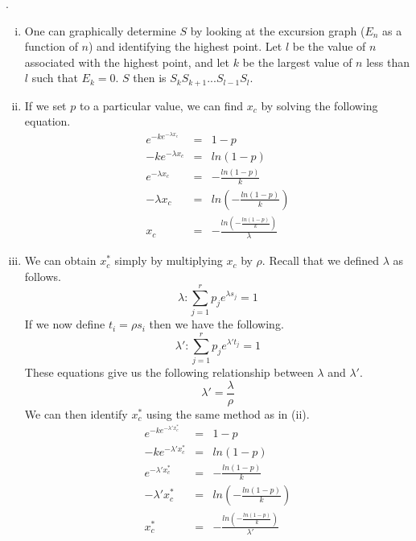 \documentclass[a4paper, 10pt]{article}
\newcounter{prob_num}
\newcommand{\problem}{\vspace{20pt}\arabic{prob_num}.\stepcounter{prob_num}\par}
\begin{document}
\problem

\begin{enumerate}[(i)]

  \item One can graphically determine $S$ by looking at the excursion graph ($E_n$ as a function of $n$) and identifying the highest point. Let $l$ be the value of $n$ associated with the highest point, and let $k$ be the largest value of $n$ less than $l$ such that $E_k = 0$. $S$ then is $S_{k} S_{k+1}...S_{l-1} S_{l}$.
  \item If we set $p$ to a particular value, we can find $x_c$ by solving the following equation.
        \begin{eqnarray}
          e^{-ke^{-\lambda x_c}} &=& 1 - p                             \nonumber \\
          -ke^{-\lambda x_c} &=& ln(1 - p)                             \nonumber \\
          e^{-\lambda x_c} &=& -\frac{ln(1 - p)}{k}                    \nonumber \\
          -\lambda x_c &=& ln\left(-\frac{ln(1 - p)}{k}\right)         \nonumber \\
          x_c &=& -\frac{ln\left(-\frac{ln(1 - p)}{k}\right)}{\lambda} \nonumber
        \end{eqnarray}
  \item We can obtain $x_c^{*}$ simply by multiplying $x_c$ by $\rho$. Recall that we defined $\lambda$ as follows. \[ \lambda: \sum_{j = 1}^{r}p_j e^{\lambda s_j} = 1 \] If we now define $t_i = \rho s_i$ then we have the following. \[ \lambda': \sum_{j = 1}^{r}p_j e^{\lambda' t_j} = 1 \] These equations give us the following relationship between $\lambda$ and $\lambda'$. \[ \lambda' = \frac{\lambda}{\rho} \] We can then identify $x_c^{*}$ using the same method as in (ii).
        \begin{eqnarray}
          e^{-ke^{-\lambda' x_c^{*}}} &=& 1 - p                                             \nonumber \\
          -ke^{-\lambda' x_c^{*}} &=& ln(1 - p)                                             \nonumber \\
          e^{-\lambda' x_c^{*}} &=& -\frac{ln(1 - p)}{k}                                    \nonumber \\
          -\lambda' x_c^{*} &=& ln\left(-\frac{ln(1 - p)}{k}\right)                         \nonumber \\
          x_c^{*} &=& -\frac{ln\left(-\frac{ln(1 - p)}{k}\right)}{\lambda'}                 \nonumber \\

\end{eqnarray}
\end{enumerate}
\end{document}
